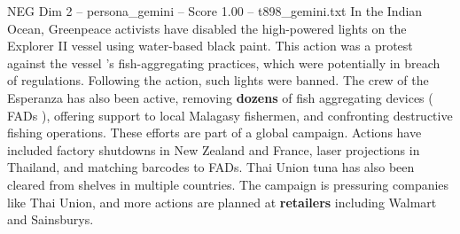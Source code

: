 \begin{textsample}{NEG Dim 2 – persona\_gemini – Score 1.00 – t898\_gemini.txt}  \label{ex:f2_neg_010}
In the Indian Ocean, Greenpeace activists have disabled the high-powered lights on the Explorer II vessel using water-based black paint.
This action was a protest against the vessel 's fish-aggregating practices, which were potentially in breach of regulations.
Following the action, such lights were banned.
The crew of the Esperanza has also been active, removing \textbf{dozens} of fish aggregating devices ( FADs ), offering support to local Malagasy fishermen, and confronting destructive fishing operations.
These efforts are part of a global campaign.
Actions have included factory shutdowns in New Zealand and France, laser projections in Thailand, and matching barcodes to FADs.
Thai Union tuna has also been cleared from shelves in multiple countries.
The campaign is pressuring companies like Thai Union, and more actions are planned at \textbf{retailers} including Walmart and Sainsburys.

\end{textsample}
